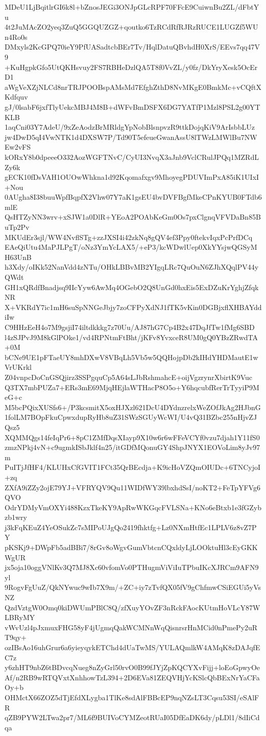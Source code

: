MDeU1LjBqitlrGI6k8l+bZnosJEGi3ONJpGLcRPF70FFcE9CuiwnBu2ZL/dFbtYu
4t2JuMAcZO2yeq3ZuQ5GGQUZGZ+qoutko6TzRCdRfRJRzRUCE1LUGZf5WUn4Ro0s
DMxyls2KcGPQ70ieY9PfUASadtcbBEr7Tv/HqlDatuQBvhdH0XrS/EEvs7qq47V9
+KuHgpkGfo5UtQKHsvuy2FS7RBHeDzlQA5T8f0VvZL/y0fz/DkYryXesk5OcErD1
aWgVeXZjNLCd8nrTRJPOOBspAMsMd7EfghZthD8NvMKgE0BmkMc+vCQftXKdfquv
gJ/0lsabF6jxfTlyUekcMBJ4M8B+dWFvBmDSFX6DG7YATfP1Mzl8PSL2g00YTKLB
1aqCni03Y7AdeU/9xZeAodzBrMRldgYpNobBlsnpvzR9ttkDojqKiV9ArIsbbLUz
jw4DwD5qI4VwNTK1d4DXSW7P/Td90T5efeueGwanAssU8lTWzLMWlBu7NWEw2vFS
kORxY8b0dpeeeO332AozWGFTNvC/CyUI3NvqX3aJnb9VclCRulJPQq1MZRdLZy6k
gECK10fDsVAH1OUOwWhkna1d92Kqomafxgv9MhoyegPDUVImPxA85iK1UIxI+Nou
0AUgha8I38buuWpfBqpfX2Vhw07Y7aK1gsEU4bvDVFBgfMkeCPnKYUB0FTdb6mlE
QsHTZyNN3wrv+xSJW1a0DlR+YEoA2POAbKeGm0Os7pxClgnqVFVDaBn85BuTp2Pv
MKUdEr3sjl/WW4NvflSTg+zzJXSI4i42zkNq8gQV4ef3Ppy0ftekvIqxPcPrfDCq
EAeQiUtu4MaPJLPgT/oNz3YmYcLAX5/+eP3/kcWDwlUep0XkYYsjwQGSyMH63UnB
h3Xdy/oIKk52NanVdd4zNTu/OHkLBBvMB2YIgqLRc7QuOuN6ZJhXQqlPV44yQWdt
GH1xQRdfBnadjsq9IIcYyw6AwMq4OGebO2Q8UnGd0hxEis5ExDZuKrYghjZfqkNR
X+VKRdY7ic1mH6suSpNNGeJbjy7zoCFPyXdNJ1fTK5vKin0DGBjxflXHBAYddiIw
C9HHzEeH4o7M9gsjiI74iltdkkkg7z70Uu/AJ87hG7Cp4B2x47DqJfTw1fMg6SBD
l4zSJPvJ9M8kGlPOke1/vd4RPNtmFtBht/jKFv8YvxceR8UM0gQ0YBzZRwdTA+0M
bCNe9UE1pFTaeUY8mhDXwV8VBqLh5Vb5w5QQHojpDb2kIHdYHDMautE1wVrUKrkl
Z04vnpcDoCnGSQjirz3SSPgquCp5A64sLJbRshmahcE+oijVgzrynrXbirtK9Vuc
Q3TX7mbPUZa7+ERs3mE69MjqHEjlaWTHacP8O5o+Y6hqcubfRerTrTyyiP9MeG+c
M5bcPQixXUSfs6+/P3kcsmitX5oxHJXzl621DcU4DYdnzrelxWeZOfJkAg2HJbnG
1folLM7BOpFkuCpwxdupRyHb8uZ31SWzSGUyWcWI/U4vQ31BZbc255nHjvZJQsz5
XQMMQgs14feIqPr6+8pC1ZMfDqsXIayp9X10w6r6wFFeVCYf0vzu7djah1Y11fS0
zmzNPkj4vN+c9ugmkISbJklf4n25/itGDfMQonuGY4ShpJNYX1EOVoLim8yJv97m
PuITjJfHF4/KLUHxCfGVIT1FCt35QrBEcdja+K9icHoVZQmOIUDc+6TNCyjoI+zq
ZXfA9iZZy2ojE79YJ+VFRYQV9Qu11WIDfWY39lbxhdSsI/noKT2+FeTpYFVg6QVO
OdrYDMyVmOXYi488KzxTkeKY9ApRwWKGqcFVLSNa+KNo6eBtxb1e3fGZybzb1wry
j3kFqKEuZ4YeOSukZc7sMIPoUJgQo2419fhktfg+Lz0NXmHtfEc1LPLV6z8vZ7PY
pKSKj9+DWpFb5adBBi7/8rGv8oWgvGumVbtcnCQxldyLjLOOktuHl3cEyGKKWgUR
jx5oja10oggVNlKv3Q7MJ8Xc60vfomVo0PTHugmViViIuTPbuIKcXJRCm9AFN9yl
9RogvFgUuZ/QkNYwuc9wIb7X9m/+ZC+iy7zTvfQX05fV9gChfmwCSiEGUi5yVsNZ
QzdVztgW0Omq0kiDWUmPBlC8Q/zfXuyYOvZF3nRckFAocKUtmHoVLcY87WLBRyMY
vWvUzl4pJxmuxFHG58yF4jUgmqQakWCMNnWqQisnrsrHnMCid0nPmePy2uRT9qy+
ozIBsAo16uhGrur6a6yieyqykETChd4dUaTwMS/YULAQmlkW4AMqK8zDAJqfEC7z
y6zhHT9nbZ6tBDvcqNueg8nZyGrl50rvO0B99fJYjZpKQCYXvFijj+loEoGpwyOe
Af/n2RB9wRTQVxtXnhhowTzL394+2D6EVa81ZEQVHjYcKSlcQbBExNrYaCFaOy+b
OHMctX66ZOZ5dTjEfdXLygba1TlKe8sdAlFBBcEP9nqNZsLT3Cqsu53SI/eSAlFR
qZB9PYW2LTwa2pr7/ML6f9BUIVoCYMZeotRUaI05DfEaDK6dy/pLDl1/8dIiCdqa
